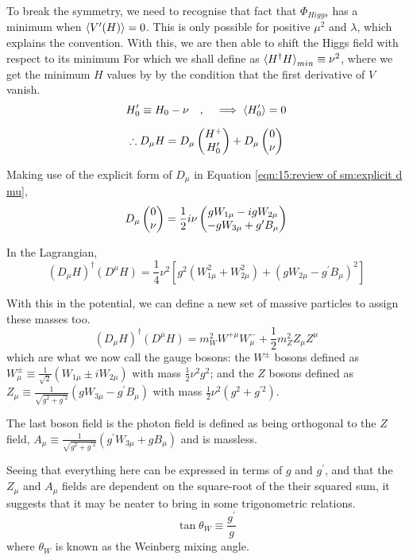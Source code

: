   To break the symmetry, we need to recognise that fact that $\Phi_{Higgs}$ has a minimum when $\braket{V^\prime(H)} = 0$. This is only possible for positive $\mu^2$ and $\lambda$, which explains the convention. With this, we are then able to shift the Higgs field with respect to its minimum For which we shall define as $\braket{H^\dagger H}_{min} \equiv \nu^2$, where we get the minimum $H$ values by by the condition that the first derivative of $V$ vanish.
  \begin{equation}
    H_0^\prime \equiv H_0 - \nu \quad , \quad \implies \braket{H_0^\prime} = 0
  \end{equation}

  \begin{equation}
    \therefore D_\mu H = D_\mu \begin{pmatrix}{H^+}\\{H_0^\prime}\end{pmatrix} + D_\mu \begin{pmatrix}{0}\\{\nu}\end{pmatrix}
  \end{equation}

  Making use of the explicit form of $D_\mu$ in Equation \ref{eqn:15:review of sm:explicit d mu},
  \begin{equation}
    D_\mu \begin{pmatrix}{0}\\{\nu}\end{pmatrix} = \frac{1}{2} i \nu \begin{pmatrix}{gW_{1\mu} - igW_{2\mu}}\\{-gW_{3\mu} + g^\prime B_\mu}\end{pmatrix}
  \end{equation}

  In the Lagrangian,
  \begin{equation}
    (D_\mu H)^\dagger (D^\mu H) = \frac{1}{4} \nu^2 \left[ g^2 (W_{1\mu}^2 + W_{2\mu}^2 ) + (gW_{2\mu} - g^\prime B_\mu)^2\right]
  \end{equation}

  With this in the potential, we can define a new set of massive particles to assign these masses too.
  \begin{equation}
    (D_\mu H)^\dagger (D^\mu H) = m_W^2 W^{+\mu}W^-_\mu + \frac{1}{2} m_Z^2 Z_\mu Z^\mu
  \end{equation}
  which are what we now call the gauge bosons: the $W^\pm$ bosons defined as $W^\pm_\mu \equiv \frac{1}{\sqrt{2}}(W_{1\mu} \pm iW_{2\mu})$ with mass $\frac{1}{2} \nu^2 g^2$; and the $Z$ bosons defined as $Z_\mu \equiv \frac{1}{\sqrt{g^2 + g^{\prime 2}}} (gW_{3\mu} - g^\prime B_\mu )$ with mass $\frac{1}{2} \nu^2 (g^2 + g^{\prime 2})$.

  The last boson field is the photon field is defined as being orthogonal to the $Z$ field, $A_\mu \equiv \frac{1}{\sqrt{g^2 + g^{\prime 2}}} (g^\prime W_{3\mu} + g B_\mu)$ and is massless.

  Seeing that everything here can be expressed in terms of $g$ and $g^\prime$, and that the $Z_\mu$ and $A_\mu$ fields are dependent on the square-root of the their squared sum, it suggests that it may be neater to bring in some trigonometric relations.
  \begin{equation}
    \tan \theta_W \equiv \frac{g^\prime}{g}
  \end{equation}
  where $\theta_W$ is known as the Weinberg mixing angle.

